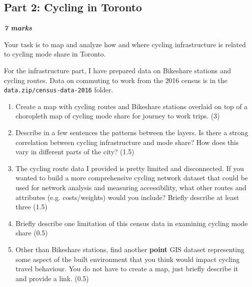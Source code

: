 \documentclass[11pt]{article}
\begin{document}
	
	
	
	
	
	
	\subsection*{Part 2: Cycling in Toronto}
	
	\vspace{-2mm}
	\textbf{\textit{7 marks}}
	
	Your task is to map and analyze how and where cycling infrastructure is related to cycling mode share in Toronto. 

	For the infrastructure part, I have prepared data on Bikeshare stations and cycling routes. Data on commuting to work from the 2016 census is in the \texttt{data.zip/census-data-2016} folder.

	\begin{enumerate}
			
		\item Create a map with cycling routes and Bikeshare stations overlaid on top of a choropleth map of cycling mode share for journey to work trips. (3)
		
		\item Describe in a few sentences the patterns between the layers. Is there a strong correlation between cycling infrastructure and mode share? How does this vary in different parts of the city? (1.5)
		
		\item The cycling route data I provided is pretty limited and disconnected. If you wanted to build a more comprehensive cycling network dataset that could be used for network analysis and measuring accessibility, what other routes and attributes (e.g. costs/weights) would you include?  Briefly describe at least three (1.5)
				
		\item Briefly describe one limitation of this census data in examining cycling mode share (0.5)
		
		\item Other than Bikeshare stations, find another \textbf{point} GIS dataset representing some aspect of the built environment that you think would impact cycling travel behaviour. You do not have to create a map, just briefly describe it and provide a link. (0.5)
		
	\end{enumerate}
	
	
	
\end{document}
